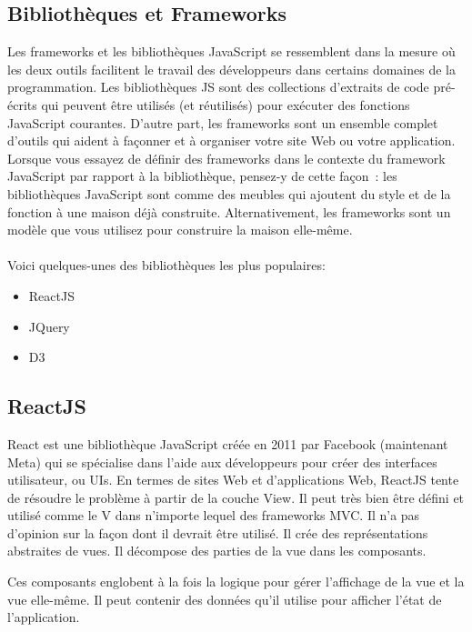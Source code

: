 \documentclass[12pt]{report}
\begin{document}
\subsection{Bibliothèques et Frameworks}
\vspace{0.1in}
\hspace*{0.16in}
Les frameworks et les bibliothèques JavaScript se ressemblent dans la mesure où les deux outils facilitent le travail des développeurs dans certains domaines de la programmation. Les bibliothèques JS sont des collections d’extraits de code pré-écrits qui peuvent être utilisés (et réutilisés) pour exécuter des fonctions JavaScript courantes. D’autre part, les frameworks sont un ensemble complet d’outils qui aident à façonner et à organiser votre site Web ou votre application. Lorsque vous essayez de définir des frameworks dans le contexte du framework JavaScript par rapport à la bibliothèque, pensez-y de cette façon : les bibliothèques JavaScript sont comme des meubles qui ajoutent du style et de la fonction à une maison déjà construite. Alternativement, les frameworks sont un modèle que vous utilisez pour construire la maison elle-même.
\\\\
Voici quelques-unes des bibliothèques les plus populaires:
\begin{itemize}
    \item ReactJS
    \item JQuery
    \item D3
\end{itemize}

\subsection{ReactJS}
\vspace{0.1in}
\hspace*{0.16in}
React est une bibliothèque JavaScript créée en 2011 par Facebook (maintenant Meta) qui se spécialise dans l’aide aux développeurs pour créer des interfaces utilisateur, ou UIs. En termes de sites Web et d’applications Web, ReactJS tente de résoudre le problème à partir de la couche View. Il peut très bien être défini et utilisé comme le V dans n’importe lequel des frameworks MVC. Il n’a pas d’opinion sur la façon dont il devrait être utilisé. Il crée des représentations abstraites de vues. Il décompose des parties de la vue dans les composants.

\newpage

\hspace*{0.16in}
Ces composants englobent à la fois la logique pour gérer l’affichage de la vue et la vue elle-même. Il peut contenir des données qu’il utilise pour afficher l’état de l’application.
\end{document}
